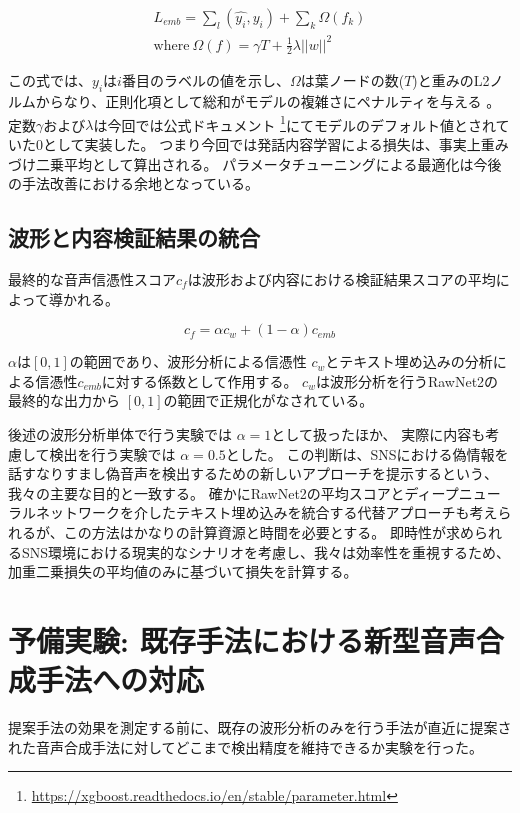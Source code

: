 \begin{align} 
        L_{emb} = \sum_l (\hat{y_i}, y_i) + \sum_k \Omega (f_k) \\
        \text{where}~\Omega (f) = \gamma T + \frac{1}{2} \lambda ||w||^2
\end{align}

この式では、$y_i$は$i$番目のラベルの値を示し、$\Omega$は葉ノードの数($T$)と重みのL2ノルムからなり、正則化項として総和がモデルの複雑さにペナルティを与える \cite{10.1145/2939672.2939785}。
定数$\gamma$および$\lambda$は今回では公式ドキュメント \footnote{\url{https://xgboost.readthedocs.io/en/stable/parameter.html}}にてモデルのデフォルト値とされていた0として実装した。
つまり今回では発話内容学習による損失は、事実上重みづけ二乗平均として算出される。
パラメータチューニングによる最適化は今後の手法改善における余地となっている。

\subsection{波形と内容検証結果の統合}
最終的な音声信憑性スコア$c_f$は波形および内容における検証結果スコアの平均によって導かれる。

\begin{equation}
    c_f = \alpha c_w + (1 - \alpha) c_{emb}
\end{equation}

$\alpha$は$[0, 1]$の範囲であり、波形分析による信憑性 $c_w$とテキスト埋め込みの分析による信憑性$c_{emb}$に対する係数として作用する。
$c_w$は波形分析を行うRawNet2の最終的な出力から $[0,1]$の範囲で正規化がなされている。

後述の波形分析単体で行う実験では $\alpha = 1$として扱ったほか、
実際に内容も考慮して検出を行う実験では $\alpha = 0.5$とした。
この判断は、SNSにおける偽情報を話すなりすまし偽音声を検出するための新しいアプローチを提示するという、我々の主要な目的と一致する。
確かにRawNet2の平均スコアとディープニューラルネットワークを介したテキスト埋め込みを統合する代替アプローチも考えられるが、この方法はかなりの計算資源と時間を必要とする。
即時性が求められるSNS環境における現実的なシナリオを考慮し、我々は効率性を重視するため、加重二乗損失の平均値のみに基づいて損失を計算する。

\section{予備実験: 既存手法における新型音声合成手法への対応}
提案手法の効果を測定する前に、既存の波形分析のみを行う手法が直近に提案された音声合成手法に対してどこまで検出精度を維持できるか実験を行った。

